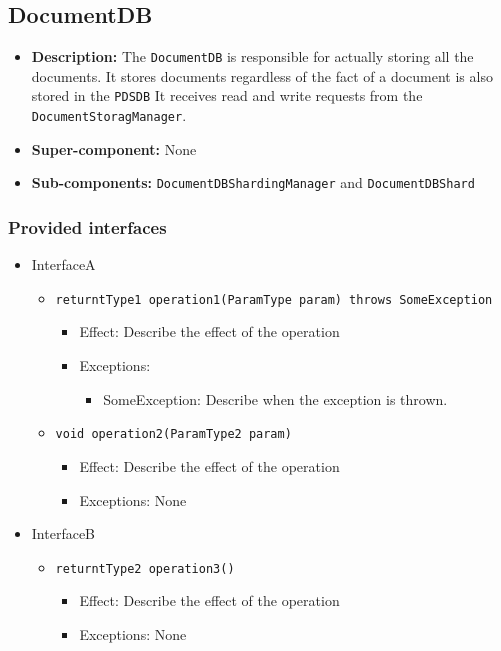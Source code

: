 \documentclass[a4paper,10pt]{article}
\begin{document}
\subsection{DocumentDB}
\begin{itemize}
    \item \textbf{Description:} The \texttt{DocumentDB} is responsible  for actually storing all the documents. It stores documents regardless of the fact of a document is also stored in the \texttt{PDSDB} It receives read and write requests from the \texttt{DocumentStoragManager}.
    \item \textbf{Super-component:} None
    \item \textbf{Sub-components:} \texttt{DocumentDBShardingManager} and \texttt{DocumentDBShard}
\end{itemize}

\subsubsection*{Provided interfaces}
\begin{itemize}
    \item InterfaceA
    \begin{itemize}
        \item \texttt{returntType1 operation1(ParamType param) throws SomeException}
        \begin{itemize}
            \item Effect: Describe the effect of the operation
            \item Exceptions:
            \begin{itemize}
                \item SomeException: Describe when the exception is thrown.
            \end{itemize}
		\end{itemize}
        \item \texttt{void operation2(ParamType2 param)}
        \begin{itemize}
             \item Effect: Describe the effect of the operation
             \item Exceptions: None
        \end{itemize} 
    \end{itemize}

    \item InterfaceB
    \begin{itemize}
        \item \texttt{returntType2 operation3()}
        \begin{itemize}
            \item Effect: Describe the effect of the operation
            \item Exceptions: None
        \end{itemize}
    \end{itemize}
\end{itemize}
\end{document}
